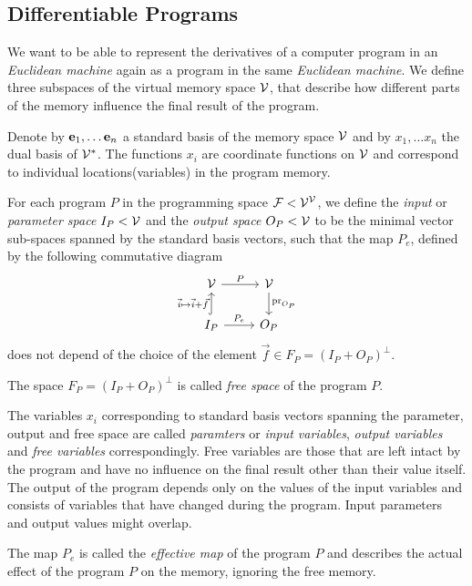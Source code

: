 \subsection{Differentiable Programs}

We want to be able to represent the derivatives of a computer program in an
\emph{Euclidean machine} again as a program in the same \emph{Euclidean machine}. We define three subspaces of the virtual memory space $\mathcal{V}$, that
describe how different parts of the memory influence the final result of the
program.   

Denote by $\mathbf{e}_1,\ldots \mathbf{e}_n$ a standard basis of the memory space $\mathcal{V}$ and by
$x_1,\ldots x_n$ the dual basis of $\mathcal{V}^*$. The functions $x_i$ are coordinate
functions on $\mathcal{V}$ and correspond to individual locations(variables) in the
program memory.

\begin{definition}
  For each program $P$ in the programming space $\mathcal{F}<\mathcal{V}^{\mathcal{V}}$,
  we define the \emph{input} or \emph{parameter space} $I_P<\mathcal{V}$ and the
  \emph{output space} $O_P<\mathcal{V}$ to be the minimal vector sub-spaces spanned by
  the standard basis vectors, such that the map $P_e$, defined by the following
  commutative diagram 
\begin{equation} 
    \label{eq:induced_map}
\begin{tikzcd}
  \VV \arrow{r}{P} & 
  \VV \arrow{d}{\mathrm{pr}_{O_P}}\\
  I_P \arrow[hook]{u}{\vec{i}\mapsto \vec{i}+\vec{f}} 
  \arrow{r}{P_e}& O_P
\end{tikzcd}
  \end{equation}
does not depend of the choice of the element 
$\vec{f}\in F_P=(I_P+O_P)^\perp$.

The space $F_P=(I_P+O_P)^\perp$ is called \emph{free space} of the program $P$.
\end{definition}

The variables $x_i$ corresponding to standard
basis vectors spanning the parameter, output and free space are called
\emph{paramters} or \emph{input variables}, \emph{output variables} and
\emph{free variables} correspondingly. Free variables are those that are
left intact by the program and have no influence on the final result other than
their value itself. The output of the program depends only on the values
of the input variables and consists of variables that have changed during
the program. Input parameters and output values might overlap. 

The map $P_e$ is called the \emph{effective map} of the program $P$ and
describes the actual effect of the program $P$ on the memory,
ignoring the free memory. 

